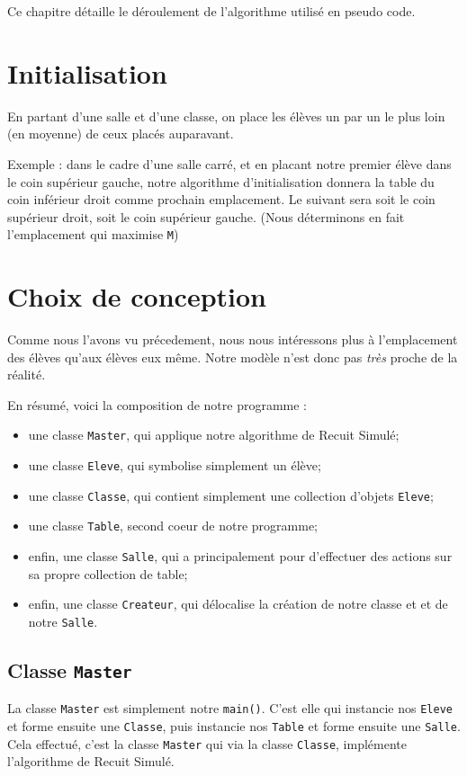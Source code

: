 \documentclass[11pt,a4paper, openany]{book}
\begin{document}
Ce chapitre détaille le déroulement de l'algorithme utilisé en pseudo code.

\section{Initialisation}
\label{init}

En partant d'une salle et d'une classe, on place les élèves un par un le plus loin (en moyenne) de ceux placés auparavant.

Exemple : dans le cadre d'une salle carré, et en placant notre premier élève dans le coin supérieur gauche, notre algorithme d'initialisation donnera la table du coin inférieur droit comme prochain emplacement.
Le suivant sera soit le coin supérieur droit, soit le coin supérieur gauche.
(Nous déterminons en fait l'emplacement qui maximise \texttt{M})

\section{Choix de conception}

Comme nous l'avons vu précedement, nous nous intéressons plus à l'emplacement des élèves qu'aux élèves eux même. Notre modèle n'est donc pas \textit{très} proche de la réalité.

En résumé, voici la composition de notre programme :
\begin{itemize}
\item une classe \texttt{Master}, qui applique notre algorithme de Recuit Simulé;
\item une classe \texttt{Eleve}, qui symbolise simplement un élève;
\item une classe \texttt{Classe}, qui contient simplement une collection d'objets \texttt{Eleve};
\item une classe \texttt{Table}, second coeur de notre programme;
\item enfin, une classe \texttt{Salle}, qui a principalement pour d'effectuer des actions sur sa propre collection de table;
\item enfin, une classe \texttt{Createur}, qui délocalise la création de notre classe et et de notre \texttt{Salle}.
\end{itemize}

\subsection{Classe \texttt{Master}}
La classe \texttt{Master} est simplement notre \texttt{main()}. C'est elle qui instancie nos \texttt{Eleve} et forme ensuite une \texttt{Classe}, puis instancie nos \texttt{Table} et forme ensuite une \texttt{Salle}.
Cela effectué, c'est la classe \texttt{Master} qui via la classe \texttt{Classe}, implémente l'algorithme de Recuit Simulé.
\end{document}
